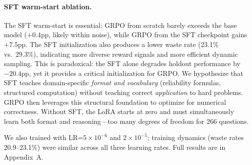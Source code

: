 \paragraph{SFT warm-start ablation.} The SFT warm-start is essential: GRPO from scratch barely exceeds the base model ($+0.4$pp, likely within noise), while GRPO from the SFT checkpoint gains $+7.5$pp. The SFT initialization also produces a lower waste rate (23.1\% vs.\ 29.3\%), indicating more diverse reward signals and more efficient dynamic sampling. This is paradoxical: the SFT alone degrades holdout performance by $-20.4$pp, yet it provides a critical initialization for GRPO. We hypothesize that SFT teaches domain-specific \emph{format and vocabulary} (reliability formulas, structured computation) without teaching correct \emph{application} to hard problems. GRPO then leverages this structural foundation to optimize for numerical correctness. Without SFT, the LoRA starts at zero and must simultaneously learn both format and reasoning---too many degrees of freedom for 266 questions.

We also trained with LR=$5\!\times\!10^{-6}$ and $2\!\times\!10^{-5}$; training dynamics (waste rates 20.9--23.1\%) were similar across all three learning rates. Full results are in Appendix~A.

